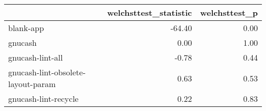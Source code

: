 \begin{tabular}{lrr}
\toprule
{} &  welchsttest\_statistic &  welchsttest\_p \\
\midrule
blank-app                          &                 -64.40 &           0.00 \\
gnucash                            &                   0.00 &           1.00 \\
gnucash-lint-all                   &                  -0.78 &           0.44 \\
gnucash-lint-obsolete-layout-param &                   0.63 &           0.53 \\
gnucash-lint-recycle               &                   0.22 &           0.83 \\
\bottomrule
\end{tabular}
